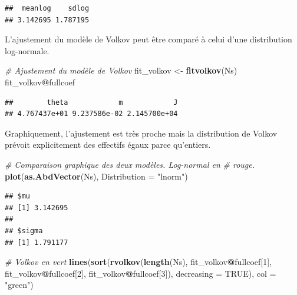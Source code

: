\documentclass[
  11pt,
  french,
  a4paper,
  extrafontsizes,onecolumn,openright
  ]{memoir}
\newenvironment{Shaded}{\begin{snugshade}}{\end{snugshade}}
\newcommand{\CommentTok}[1]{\textcolor[rgb]{0.56,0.35,0.01}{\textit{#1}}}
\newcommand{\DataTypeTok}[1]{\textcolor[rgb]{0.13,0.29,0.53}{#1}}
\newcommand{\DecValTok}[1]{\textcolor[rgb]{0.00,0.00,0.81}{#1}}
\newcommand{\KeywordTok}[1]{\textcolor[rgb]{0.13,0.29,0.53}{\textbf{#1}}}
\newcommand{\NormalTok}[1]{#1}
\newcommand{\OperatorTok}[1]{\textcolor[rgb]{0.81,0.36,0.00}{\textbf{#1}}}
\newcommand{\OtherTok}[1]{\textcolor[rgb]{0.56,0.35,0.01}{#1}}
\newcommand{\StringTok}[1]{\textcolor[rgb]{0.31,0.60,0.02}{#1}}
\begin{document}
\begin{verbatim}
##  meanlog    sdlog 
## 3.142695 1.787195
\end{verbatim}

\normalsize

L'ajustement du modèle de Volkov peut être comparé à celui d'une distribution log-normale.

\scriptsize

\begin{Shaded}
\begin{Highlighting}[]
\CommentTok{# Ajustement du modèle de Volkov}
\NormalTok{fit_volkov <-}\StringTok{ }\KeywordTok{fitvolkov}\NormalTok{(Ns)}
\NormalTok{fit_volkov}\OperatorTok{@}\NormalTok{fullcoef}
\end{Highlighting}
\end{Shaded}

\begin{verbatim}
##        theta            m            J 
## 4.767437e+01 9.237586e-02 2.145700e+04
\end{verbatim}

\normalsize

Graphiquement, l'ajustement est très proche mais la distribution de Volkov prévoit explicitement des effectifs égaux parce qu'entiers.

\scriptsize

\begin{Shaded}
\begin{Highlighting}[]
\CommentTok{# Comparaison graphique des deux modèles. Log-normal en}
\CommentTok{# rouge.}
\KeywordTok{plot}\NormalTok{(}\KeywordTok{as.AbdVector}\NormalTok{(Ns), }\DataTypeTok{Distribution =} \StringTok{"lnorm"}\NormalTok{)}
\end{Highlighting}
\end{Shaded}

\begin{verbatim}
## $mu
## [1] 3.142695
## 
## $sigma
## [1] 1.791177
\end{verbatim}

\begin{Shaded}
\begin{Highlighting}[]
\CommentTok{# Volkov en vert}
\KeywordTok{lines}\NormalTok{(}\KeywordTok{sort}\NormalTok{(}\KeywordTok{rvolkov}\NormalTok{(}\KeywordTok{length}\NormalTok{(Ns), fit_volkov}\OperatorTok{@}\NormalTok{fullcoef[}\DecValTok{1}\NormalTok{], fit_volkov}\OperatorTok{@}\NormalTok{fullcoef[}\DecValTok{2}\NormalTok{],}
\NormalTok{    fit_volkov}\OperatorTok{@}\NormalTok{fullcoef[}\DecValTok{3}\NormalTok{]), }\DataTypeTok{decreasing =} \OtherTok{TRUE}\NormalTok{), }\DataTypeTok{col =} \StringTok{"green"}\NormalTok{)}
\end{Highlighting}
\end{Shaded}
\end{document}
